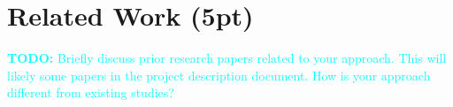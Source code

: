\documentclass[twocolumn]{article}
\newcommand{\todo}[1]{\textcolor{cyan}{\textbf{TODO:} #1}}
\begin{document}




 \section{Related Work (5pt)}
\todo{Briefly discuss prior research papers related to your approach. This will
likely some papers in the project description document. How is your approach
different from existing studies?}

\end{document}
